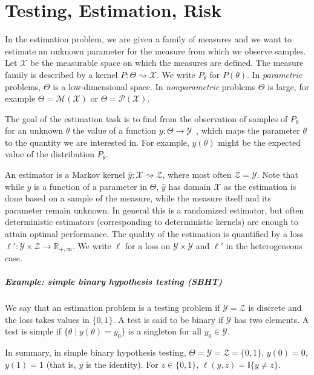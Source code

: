 \chapter{Testing, Estimation, Risk}

In the estimation problem, we are given a family of measures and we want to estimate an unknown parameter for the measure from which we observe samples.
Let $\mathcal X$ be the measurable space on which the measures are defined.
The measure family is described by a kernel $P : \Theta \rightsquigarrow \mathcal X$. We write $P_\theta$ for $P(\theta)$.
In \emph{parametric} problems, $\Theta$ is a low-dimensional space. In \emph{nonparametric} problems $\Theta$ is large, for example $\Theta = \mathcal M (\mathcal X)$ or $\Theta = \mathcal P(\mathcal X)$.

The goal of the estimation task is to find from the observation of samples of $P_\theta$ for an unknown $\theta$ the value of a function $y : \Theta \to \mathcal Y$~, which maps the parameter $\theta$ to the quantity we are interested in. For example, $y(\theta)$ might be the expected value of the distribution $P_\theta$.

An estimator is a Markov kernel $\hat{y} : \mathcal X \rightsquigarrow \mathcal Z$, where most often $\mathcal Z = \mathcal Y$.
Note that while $y$ is a function of a parameter in $\Theta$, $\hat{y}$ has domain $\mathcal X$ as the estimation is done based on a sample of the measure, while the measure itself and its parameter remain unknown.
In general this is a randomized estimator, but often deterministic estimators (corresponding to deterministic kernels) are enough to attain optimal performance.
The quality of the estimation is quantified by a loss $\ell' : \mathcal Y \times \mathcal Z \to \mathbb{R}_{+, \infty}$. We write $\ell$ for a loss on $\mathcal Y \times \mathcal Y$ and $\ell'$ in the heterogeneous case.

\paragraph{Example: simple binary hypothesis testing (SBHT)}

We say that an estimation problem is a testing problem if $\mathcal Y = \mathcal Z$ is discrete and the loss takes values in $\{0, 1\}$.
A test is said to be binary if $\mathcal Y$ has two elements.
A test is simple if $\{\theta \mid y(\theta) = y_0\}$ is a singleton for all $y_0 \in \mathcal Y$.

In summary, in simple binary hypothesis testing, $\Theta = \mathcal Y = \mathcal Z = \{0,1\}$, $y(0) = 0$, $y(1) = 1$ (that is, $y$ is the identity). For $z \in \{0,1\}$, $\ell(y, z) = \mathbb{I}\{y \ne z\}$.

